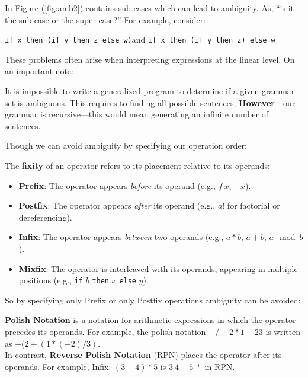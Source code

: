 \noindent
In Figure (\ref{fig:amb2}) contains sub-cases which can lead to ambiguity. As, ``is it the sub-case or the super-case?'' For 
example, consider:
\begin{center}
    \texttt{\textcolor{Wine}{if x then (if y then z else w)}}\quad and \quad \texttt{\textcolor{Wine}{if x then (if y then z) else w}}
\end{center}

\noindent 
These problems often arise when interpreting expressions at the linear level. On an important note:
\begin{theo}
    
    It is impossible to write a generalized program to determine if a given grammar set is ambiguous.
    This requires to finding all possible sentences; \textbf{However}---our grammar is recursive---this would mean generating 
    an infinite number of sentences.
\end{theo}

\noindent
Though we can avoid ambiguity by specifying our operation order:
\begin{Def}[Fixity]

    The \textbf{fixity} of an operator refers to its placement relative to its operands:
    
    \begin{itemize}
        \item \textbf{Prefix}: The operator appears \textit{before} its operand (e.g., $f\ x$, $-x$).
        \item \textbf{Postfix}: The operator appears \textit{after} its operand (e.g., $a!$ for factorial or dereferencing).
        \item \textbf{Infix}: The operator appears \textit{between} two operands (e.g., $a * b$, $a + b$, $a \mod b$).
        \item \textbf{Mixfix}: The operator is interleaved with its operands, appearing in multiple positions (e.g., \texttt{if} $b$ \texttt{then} $x$ \texttt{else} $y$).
    \end{itemize} 
    \end{Def}

\newpage 
\noindent
So by specifying only Prefix or only Postfix operations ambiguity can be avoided:
\begin{Def}

    \textbf{Polish Notation} is a notation for arithmetic expressions in which the operator precedes its operands. For example, the polish notation $- / + 2 * 1 - 2 3$ is written as $- (2 + (1 * (- 2) / 3)$.\\
    
    \noindent
    In contrast, \textbf{Reverse Polish Notation} (RPN) places the operator after its operands. For example, Infix: $(3 + 4) * 5$ is $3\ 4 + 5\ *$ in RPN.
\end{Def}

